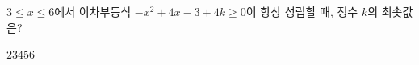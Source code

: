 $3\le x\le 6$에서 이차부등식 $-x^2+4x-3+4k\ge 0$이 항상 성립할 때, 정수 $k$의 최솟값은?
\begin{choices32}{$2$}{$3$}{$4$}{$5$}{$6$}\end{choices32}
